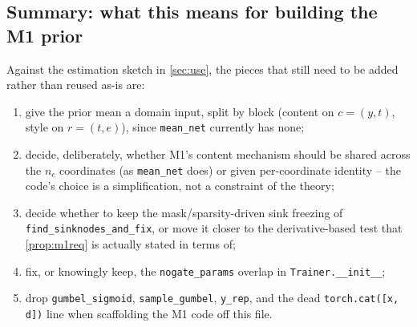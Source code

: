 \subsection{Summary: what this means for building the M1 prior}
Against the estimation sketch in \cref{sec:use}, the pieces that still need to be added rather than reused
as-is are:
\vspace{-\parskip}
\begin{enumerate}[label=(\roman*),leftmargin=2.2em,itemsep=0pt,topsep=0pt,parsep=0.205em,partopsep=0pt]
\item give the prior mean a domain input, split by block (content on $c=(y,t)$, style on $r=(t,e)$), since
      \texttt{mean\_net} currently has none;
\item decide, deliberately, whether M1's content mechanism should be shared across the $n_c$ coordinates (as
      \texttt{mean\_net} does) or given per-coordinate identity -- the code's choice is a simplification, not a
      constraint of the theory;
\item decide whether to keep the mask/sparsity-driven sink freezing of
      \texttt{find\_sinknodes\_and\_fix}, or move it closer to the derivative-based test that
      \cref{prop:m1req} is actually stated in terms of;
\item fix, or knowingly keep, the \texttt{nogate\_params} overlap in \texttt{Trainer.\_\_init\_\_};
\item drop \texttt{gumbel\_sigmoid}, \texttt{sample\_gumbel}, \texttt{y\_rep}, and the dead
      \texttt{torch.cat([x, d])} line when scaffolding the M1 code off this file.
\end{enumerate}
